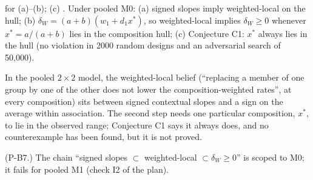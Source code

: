 \begin{result}\label{res:pn}
 for (a)--(b); (c) . Under pooled M0: (a) signed
slopes imply weighted-local on the hull; (b) $\delta_W=(a+b)(w_1+d_1x^*)$, so
weighted-local implies $\delta_W\ge0$ whenever $x^*=a/(a+b)$ lies in the
composition hull; (c) Conjecture C1: $x^*$ always lies in the hull (no violation
in 2000 random designs and an adversarial search of 50{,}000).
\end{result}
\begin{plain}
In the pooled $2\times2$ model, the weighted-local belief (``replacing a member of
one group by one of the other does not lower the composition-weighted rates'',
at every composition) sits between signed contextual slopes and a sign on the
average within association. The second step needs one particular composition,
$x^*$, to lie in the observed range; Conjecture C1 says it always does, and no
counterexample has been found, but it is not proved.
\end{plain}
\begin{revnote}
(P-B7.) The chain ``signed slopes $\subset$ weighted-local $\subset\delta_W\ge0$''
is scoped to M0; it fails for pooled M1 (check I2 of the plan).
\end{revnote}
